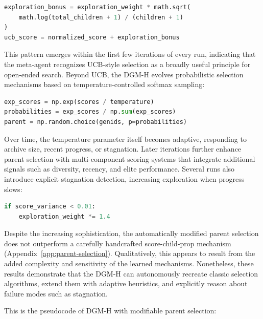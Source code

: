 \begin{lstlisting}[language=Python]
exploration_bonus = exploration_weight * math.sqrt(
    math.log(total_children + 1) / (children + 1)
)
ucb_score = normalized_score + exploration_bonus
\end{lstlisting}

This pattern emerges within the first few iterations of every run, indicating that the meta-agent recognizes UCB-style selection as a broadly useful principle for open-ended search. Beyond UCB, the DGM-H evolves probabilistic selection mechanisms based on temperature-controlled softmax sampling:

\begin{lstlisting}[language=Python]
exp_scores = np.exp(scores / temperature)
probabilities = exp_scores / np.sum(exp_scores)
parent = np.random.choice(genids, p=probabilities)
\end{lstlisting}

Over time, the temperature parameter itself becomes adaptive, responding to archive size, recent progress, or stagnation. Later iterations further enhance parent selection with multi-component scoring systems that integrate additional signals such as diversity, recency, and elite performance. Several runs also introduce explicit stagnation detection, increasing exploration when progress slows:

\begin{lstlisting}[language=Python]
if score_variance < 0.01:
    exploration_weight *= 1.4
\end{lstlisting}

Despite the increasing sophistication, the automatically modified parent selection does not outperform a carefully handcrafted score-child-prop mechanism (Appendix~\ref{app:parent-selection}). Qualitatively, this appears to result from the added complexity and sensitivity of the learned mechanisms. Nonetheless, these results demonstrate that the DGM-H can autonomously recreate classic selection algorithms, extend them with adaptive heuristics, and explicitly reason about failure modes such as stagnation.

This is the pseudocode of DGM-H with modifiable parent selection:

